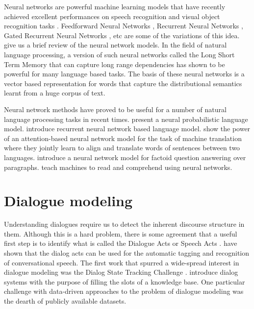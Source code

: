 \documentclass[11pt]{report}
\renewcommand\cite{\citep}	%
\begin{document}
Neural networks are powerful machine learning models that have recently achieved excellent performances on speech recognition \cite{hinton2012deep} and visual object recognition tasks \cite{krizhevsky2012imagenet}. Feedforward Neural Networks \cite{bebis1994feed}, Recurrent Neural Networks \cite{medsker2001recurrent}, Gated Recurrent Neural Networks \cite{bahdanau2014neural}, etc are some of the variations of this idea. \cite{lecun2015deep} give us a brief review of the neural network models. In the field of natural language processing, a version of such neural networks called the Long Short Term Memory \cite{hochreiter1997long} that can capture long range dependencies has shown to be powerful for many language based tasks. The basis of these neural networks is a vector based representation for words \cite{mikolov2013distributed,pennington2014glove} that capture the distributional semantics learnt from a huge corpus of text. 

Neural network methods have proved to be useful for a number of natural language processing tasks in recent times. \cite{bengio2003neural} present a neural probabilistic language model. \cite{mikolov2010recurrent} introduce recurrent neural network based language model.\cite{bahdanau2015neural} show the power of an attention-based neural network model for the task of machine translation where they jointly learn to align and translate words of sentences between two languages. \cite{iyyer2014neural} introduce a neural network model for factoid question answering over paragraphs. \cite{hermann2015teaching} teach machines to read and comprehend using neural networks. 

\section{Dialogue modeling}

Understanding dialogues require us to detect the inherent discourse structure in them. Although this is a hard problem, there is some agreement that a useful first step is to identify what is called the Dialogue Acts or Speech Acts \cite{searle1969speech}. \cite{stolcke2000dialogue} have shown that the dialog acts can be used for the automatic tagging and recognition of conversational speech. The first work that spurred a wide-spread interest in dialogue modeling was the Dialog State Tracking Challenge \cite{williams2013dialog}. \cite{lemon2006isu} introduce dialog systems with the purpose of filling the slots of a knowledge base. One particular challenge with data-driven approaches to the problem of dialogue modeling was the dearth of publicly available datasets. 
\end{document}
